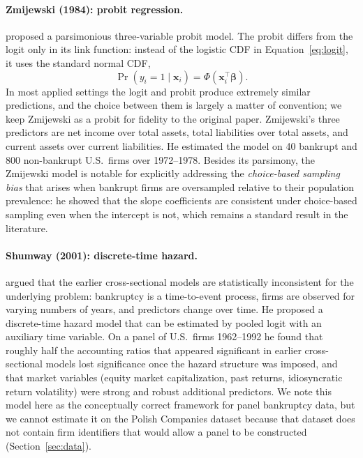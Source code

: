 \documentclass[11pt,a4paper]{article}
\begin{document}
\paragraph{Zmijewski (1984): probit regression.}
\cite{zmijewski1984} proposed a parsimonious three-variable probit model.
The probit differs from the logit only in its link function: instead of the
logistic CDF in Equation~\ref{eq:logit}, it uses the standard normal CDF,
\begin{equation}
\Pr(y_i = 1 \mid \mathbf{x}_i) = \Phi\!\left( \mathbf{x}_i^\top \boldsymbol{\beta} \right).
\label{eq:probit}
\end{equation}
In most applied settings the logit and probit produce extremely similar
predictions, and the choice between them is largely a matter of convention;
we keep Zmijewski as a probit for fidelity to the original paper. Zmijewski's
three predictors are net income over total assets, total liabilities over
total assets, and current assets over current liabilities. He estimated the
model on 40 bankrupt and 800 non-bankrupt U.S.\ firms over 1972--1978. Besides
its parsimony, the Zmijewski model is notable for explicitly addressing the
\textit{choice-based sampling bias} that arises when bankrupt firms are
oversampled relative to their population prevalence: he showed that the slope
coefficients are consistent under choice-based sampling even when the
intercept is not, which remains a standard result in the literature.

\paragraph{Shumway (2001): discrete-time hazard.}
\cite{shumway2001} argued that the earlier cross-sectional models are
statistically inconsistent for the underlying problem: bankruptcy is a
time-to-event process, firms are observed for varying numbers of years, and
predictors change over time. He proposed a discrete-time hazard model that
can be estimated by pooled logit with an auxiliary time variable. On a panel
of U.S.\ firms 1962--1992 he found that roughly half the accounting ratios
that appeared significant in earlier cross-sectional models lost
significance once the hazard structure was imposed, and that market variables
(equity market capitalization, past returns, idiosyncratic return volatility)
were strong and robust additional predictors. We note this model here as the
conceptually correct framework for panel bankruptcy data, but we cannot
estimate it on the Polish Companies dataset because that dataset does not
contain firm identifiers that would allow a panel to be constructed
(Section~\ref{sec:data}).
\end{document}
